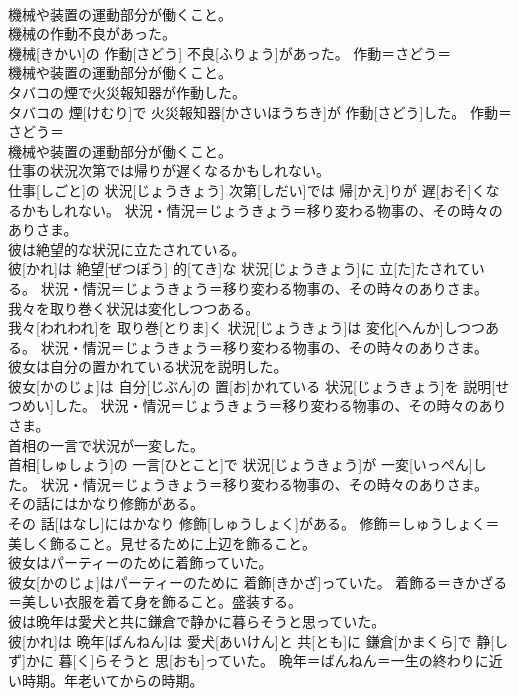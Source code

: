 \documentclass[8pt]{extreport}
\begin{document}
\begin{CJK}{UTF8}{min}
{\\	機械や装置の運動部分が働くこと。
\\	機械の作動不良があった。	
\\	機械[きかい]の 作動[さどう] 不良[ふりょう]があった。	作動＝さどう＝ 
\\	機械や装置の運動部分が働くこと。
\\	タバコの煙で火災報知器が作動した。	
\\	タバコの 煙[けむり]で 火災報知器[かさいほうちき]が 作動[さどう]した。	作動＝さどう＝ 
\\	機械や装置の運動部分が働くこと。
\\	仕事の状況次第では帰りが遅くなるかもしれない。	
\\	仕事[しごと]の 状況[じょうきょう] 次第[しだい]では 帰[かえ]りが 遅[おそ]くなるかもしれない。	状況・情況＝じょうきょう＝移り変わる物事の、その時々のありさま。
\\	彼は絶望的な状況に立たされている。	
\\	彼[かれ]は 絶望[ぜつぼう] 的[てき]な 状況[じょうきょう]に 立[た]たされている。	状況・情況＝じょうきょう＝移り変わる物事の、その時々のありさま。
\\	我々を取り巻く状況は変化しつつある。	
\\	我々[われわれ]を 取り巻[とりま]く 状況[じょうきょう]は 変化[へんか]しつつある。	状況・情況＝じょうきょう＝移り変わる物事の、その時々のありさま。
\\	彼女は自分の置かれている状況を説明した。	
\\	彼女[かのじょ]は 自分[じぶん]の 置[お]かれている 状況[じょうきょう]を 説明[せつめい]した。	状況・情況＝じょうきょう＝移り変わる物事の、その時々のありさま。
\\	首相の一言で状況が一変した。	
\\	首相[しゅしょう]の 一言[ひとこと]で 状況[じょうきょう]が 一変[いっぺん]した。	状況・情況＝じょうきょう＝移り変わる物事の、その時々のありさま。
\\	その話にはかなり修飾がある。	
\\	その 話[はなし]にはかなり 修飾[しゅうしょく]がある。	修飾＝しゅうしょく＝美しく飾ること。見せるために上辺を飾ること。
\\	彼女はパーティーのために着飾っていた。	
\\	彼女[かのじょ]はパーティーのために 着飾[きかざ]っていた。	着飾る＝きかざる＝美しい衣服を着て身を飾ること。盛装する。
\\	彼は晩年は愛犬と共に鎌倉で静かに暮らそうと思っていた。	
\\	彼[かれ]は 晩年[ばんねん]は 愛犬[あいけん]と 共[とも]に 鎌倉[かまくら]で 静[しず]かに 暮[く]らそうと 思[おも]っていた。	晩年＝ばんねん＝一生の終わりに近い時期。年老いてからの時期。
}
\end{CJK}
\end{document}
